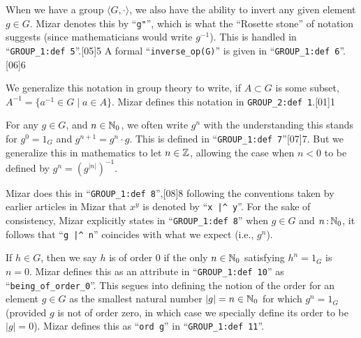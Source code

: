 When we have a group $\langle G,\cdot\rangle$, we also have the ability
to invert any given element $g\in G$. Mizar denotes this by
``\verb#g"#'', which is what the ``Rosette stone'' of notation suggests
(since mathematicians would write $g^{-1}$). This is handled in
``\verb#GROUP_1:def 5#''.[05]{5}
A formal ``\verb#inverse_op(G)#'' is given in
``\verb#GROUP_1:def 6#''.[06]{6}

\begin{remark}
We generalize this notation in group theory to write, if $A\subset G$ is
some subset, $A^{-1}=\{a^{-1}\in G\mid a\in A\}$. Mizar defines this
notation in \verb#GROUP_2:def 1#.[01]{1}
\end{remark}

For any $g\in G$, and $n\in\mathbb{N}_{0}$, we often write $g^{n}$ with the
understanding this stands for $g^{0}=1_{G}$ and $g^{n+1}=g^{n}\cdot g$.
This is defined in ``\verb#GROUP_1:def 7#''[07]{7}. But we generalize this in
mathematics to let $n\in\mathbb{Z}$, allowing the case when $n<0$ to be defined
by $g^{n} = (g^{|n|})^{-1}$.

Mizar does this in
``\verb#GROUP_1:def 8#'',[08]{8} following the conventions
taken by earlier articles in Mizar that $x^{y}$ is denoted by
``\verb#x |^ y#''.
For the sake of consistency, Mizar explicitly states in
``\verb#GROUP_1:def 8#'' when $g\in G$ and $n\mathop{:}\nolimits \mathbb{N}_{0}$, it follows
that ``\verb#g |^ n#'' coincides with what we expect (i.e., $g^{n}$).

If $h\in G$, then we say $h$ is of order 0 if the only $n\in\mathbb{N}_{0}$
satisfying $h^{n}=1_{G}$ is $n=0$. Mizar defines this as an attribute in
``\verb#GROUP_1:def 10#'' as ``\verb#being_of_order_0#''.
This segues into defining the notion of the order for an element $g\in G$
as the smallest natural number $|g|=n\in\mathbb{N}_{0}$ for which $g^{n}=1_{G}$
(provided $g$ is not of order zero, in which case we specially define
its order to be $|g|=0$). Mizar defines this as
``\verb#ord g#'' in ``\verb#GROUP_1:def 11#''.


